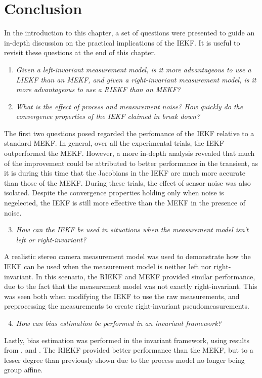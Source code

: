 \section{Conclusion}

In the introduction to this chapter, a set of questions were presented to guide an in-depth discussion on the practical implications of the IEKF. It is useful to revisit these questions at the end of this chapter. 

\begin{enumerate}
	\item \emph{Given a left-invariant measurement model, is it more advantageous to use a LIEKF than an MEKF, and given a right-invariant measurement model, is it more advantageous to use a RIEKF than an MEKF?}
	
	\item \emph{What is the effect of process and measurement noise? How quickly do the convergence properties of the IEKF claimed in \cite{Barrau2017,Barrau2018} break down?}
	
\end{enumerate}

The first two questions posed regarded the perfomance of the IEKF relative to a standard MEKF. In general, over all the experimental trials, the IEKF outperformed the MEKF. However, a more in-depth analysis revealed that much of the improvement could be attributed to better performance in the transient, as it is during this time that the Jacobians in the IEKF are much more accurate than those of the MEKF. During these trials, the effect of sensor noise was also isolated. Despite the convergence properties holding only when noise is negelected, the IEKF is still more effective than the MEKF in the presence of noise.

\begin{enumerate}
	\setcounter{enumi}{2}
	\item \emph{How can the IEKF be used in situations when the measurement model isn't left or right-invariant?}
	
\end{enumerate}

A realistic stereo camera measurement model was used to demonstrate how the IEKF can be used when the measurement model is neither left nor right-invariant. In this scenario, the RIEKF and MEKF provided similar performance, due to the fact that the measurement model was not exactly right-invariant. This was seen both when modifying the IEKF to use the raw measurements, and preprocessing the measurements to create right-invariant pseudomeasurements.

\begin{enumerate}
	\setcounter{enumi}{3}
	\item \emph{How can bias estimation be performed in an invariant framework?}
	
\end{enumerate}

 Lastly, bias estimation was performed in the invariant framework, using results from \cite{Barrau2015}, \cite{Hartley2018} and \cite{Heo2018}. The RIEKF provided better performance than the MEKF, but to a lesser degree than previously shown due to the process model no longer being group affine.